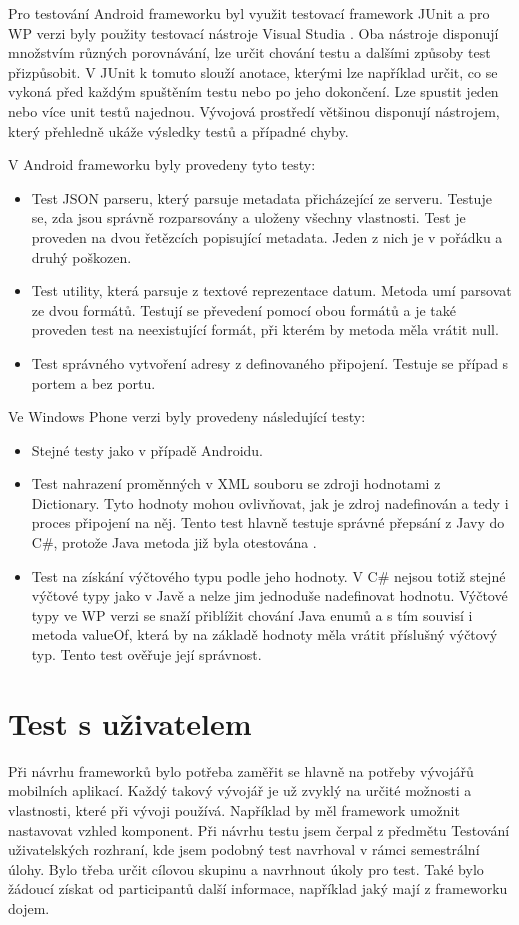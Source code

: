 Pro testování Android frameworku byl využit testovací framework JUnit \cite{junit} a pro WP verzi byly použity testovací nástroje Visual Studia \cite{vs-unit}. Oba nástroje disponují množstvím různých porovnávání, lze určit chování testu a dalšími způsoby test přizpůsobit. V JUnit k tomuto slouží anotace, kterými lze například určit, co se vykoná před každým spuštěním testu nebo po jeho dokončení. Lze spustit jeden nebo více unit testů najednou. Vývojová prostředí většinou disponují nástrojem, který přehledně ukáže výsledky testů a případné chyby. 

V Android frameworku byly provedeny tyto testy:
\begin{itemize}
\item Test JSON parseru, který parsuje metadata přicházející ze serveru. Testuje se, zda jsou správně rozparsovány a uloženy všechny vlastnosti. Test je proveden na dvou řetězcích popisující metadata. Jeden z nich je v pořádku a druhý poškozen.
\item Test utility, která parsuje z textové reprezentace datum. Metoda umí parsovat ze dvou formátů. Testují se převedení pomocí obou formátů a je také proveden test na neexistující formát, při kterém by metoda měla vrátit null.
\item Test správného vytvoření adresy z definovaného připojení. Testuje se případ s portem a bez portu.
\end{itemize} 
Ve Windows Phone verzi byly provedeny následující testy:
\begin{itemize}
\item Stejné testy jako v případě Androidu.
\item Test nahrazení proměnných v XML souboru se zdroji hodnotami z Dictionary. Tyto hodnoty mohou ovlivňovat, jak je zdroj nadefinován a tedy i proces připojení na něj. Tento test hlavně testuje správné přepsání z Javy do C\#, protože Java metoda již byla otestována \cite{tomasek-thesis}.
\item Test na získání výčtového typu podle jeho hodnoty. V C\# nejsou totiž stejné výčtové typy jako v Javě a nelze jim jednoduše nadefinovat hodnotu. Výčtové typy ve WP verzi se snaží přiblížit chování Java enumů a s tím souvisí i metoda valueOf, která by na základě hodnoty měla vrátit příslušný výčtový typ. Tento test ověřuje její správnost.
\end{itemize} 

\section{Test s uživatelem}
Při návrhu frameworků bylo potřeba zaměřit se hlavně na potřeby vývojářů mobilních aplikací. Každý takový vývojář je už zvyklý na určité možnosti a vlastnosti, které při vývoji používá. Například by měl framework umožnit nastavovat vzhled komponent. Při návrhu testu jsem čerpal z předmětu Testování uživatelských rozhraní, kde jsem podobný test navrhoval v rámci semestrální úlohy. Bylo třeba určit cílovou skupinu a navrhnout úkoly pro test. Také bylo žádoucí získat od participantů další informace, například jaký mají z frameworku dojem.


